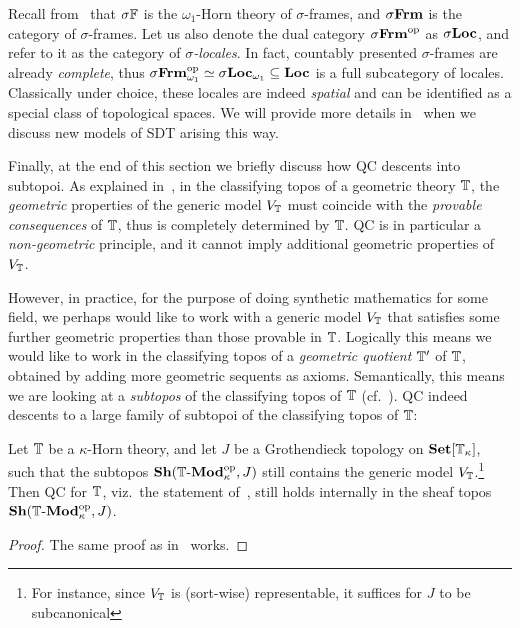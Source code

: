 \begin{example}\label{exa:pshsigmaframe}
  Recall from~ that $\sigma\mathbb{F}$ is the $\omega_1$-Horn theory of $\sigma$-frames, and $\sigma\mathbf{Frm}$ is the category of $\sigma$-frames. Let us also denote the dual category $\sigma\mathbf{Frm}^{\mathrm{op}}$ as $\sigma\mathbf{Loc}$, and refer to it as the category of \emph{$\sigma$-locales}. In fact, countably presented $\sigma$-frames are already \emph{complete}, thus $\sigma\mathbf{Frm}_{\omega_1}^{\mathrm{op}} \simeq \sigma\mathbf{Loc}_{\omega_1} \subseteq \mathbf{Loc}$ is a full subcategory of locales. Classically under choice, these locales are indeed \emph{spatial} and can be identified as a special class of topological spaces. We will provide more details in~ when we discuss new models of \gls{SDT} arising this way.
\end{example}

Finally, at the end of this section we briefly discuss how \gls{QC} descents into subtopoi. As explained in~, in the classifying topos of a geometric theory $\mathbb{T}$, the \emph{geometric} properties of the generic model $V_{\mathbb{T}}$ must coincide with the \emph{provable consequences} of $\mathbb{T}$, thus is completely determined by $\mathbb{T}$. \gls{QC} is in particular a \emph{non-geometric} principle, and it cannot imply additional geometric properties of $V_{\mathbb{T}}$. 

However, in practice, for the purpose of doing synthetic mathematics for some field, we perhaps would like to work with a generic model $V_{\mathbb{T}}$ that satisfies some further geometric properties than those provable in $\mathbb{T}$. Logically this means we would like to work in the classifying topos of a \emph{geometric quotient} $\mathbb{T}'$ of $\mathbb{T}$, obtained by adding more geometric sequents as axioms. Semantically, this means we are looking at a \emph{subtopos} of the classifying topos of $\mathbb{T}$ (cf.~\citet[Thm.~3.2.5]{caramello2018theories}). \gls{QC} indeed descents to a large family of subtopoi of the classifying topos of $\mathbb{T}$:

\begin{theorem}\label{thm:qcdescent}
  Let $\mathbb{T}$ be a $\kappa$-Horn theory, and let $J$ be a Grothendieck topology on $\mathbf{Set}[\mathbb{T}_\kappa]$, such that the subtopos $\mathbf{Sh}(\mathbb{T}\text{-}\mathbf{Mod}_\kappa^{\mathrm{op}},J)$ still contains the generic model $V_{\mathbb{T}}$.\footnote{For instance, since $V_{\mathbb{T}}$ is (sort-wise) representable, it suffices for $J$ to be subcanonical} Then \gls{QC} for $\mathbb{T}$, viz.\ the statement of~, still holds internally in the sheaf topos $\mathbf{Sh}(\mathbb{T}\text{-}\mathbf{Mod}_\kappa^{\mathrm{op}},J)$.
\end{theorem}
\begin{proof}
  The same proof as in~\citet[Thm.~4.11]{blechschmidt_general_2020} works.
\end{proof}

